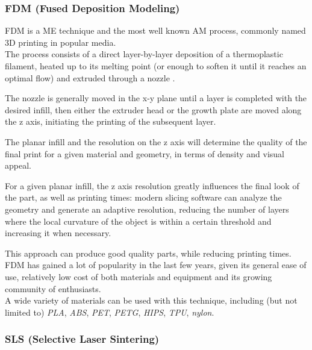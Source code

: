 \documentclass{article}
\begin{document}
    \subsubsection{FDM (Fused Deposition Modeling) \label{FDM_general}}

    FDM is a ME technique and the most well known AM process, commonly named 3D printing in popular media. \\
    
    The process consists of a direct layer-by-layer deposition of a thermoplastic filament, heated up to its melting point (or enough to soften it until it reaches an 
    optimal flow) and extruded through a nozzle \autocites*{Recent_progress_polymers_AM}{Kovalcik_PHA_Review}. 

    The nozzle is generally moved in the x-y plane until a layer is completed with the desired infill, then either the extruder head or the growth plate are moved along the z axis, 
    initiating the printing of the subsequent layer.

    The planar infill and the resolution on the z axis will determine the quality of the final print for a given material and geometry, in terms of density and visual appeal.
    
    For a given planar infill, the z axis resolution greatly influences the final look of the part, as well as printing times:
    modern slicing software can analyze the geometry and generate an adaptive resolution, reducing the number of layers where the local  
    curvature of the object is within a certain threshold and increasing it when necessary. 
    
    This approach can produce good quality parts, 
    while reducing printing times. \\ 
    
    FDM has gained a lot of popularity in the last few years, given its general ease of use, relatively low cost of both materials and equipment and its growing 
    community of enthusiasts. \\

    A wide variety of materials can be used with this technique, including (but not limited to) 
    \textit{PLA}, \textit{ABS}, \textit{PET}, \textit{PETG}, \textit{HIPS}, \textit{TPU}, \textit{nylon}. \clearpage

    \subsubsection{SLS (Selective Laser Sintering) \label{SLS_general}}
\end{document}
